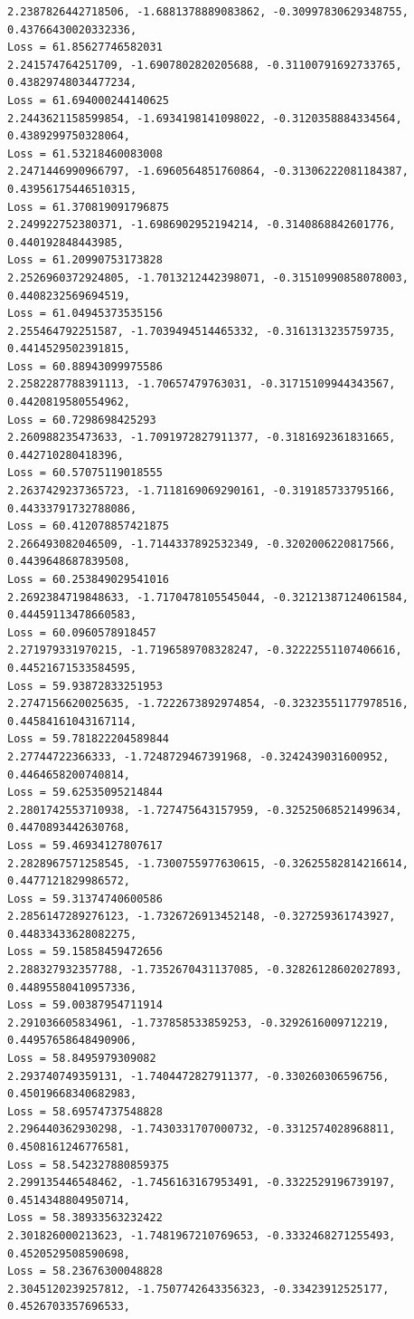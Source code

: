 \documentclass[11pt]{article}
\begin{document}
\begin{Verbatim}[commandchars=\\\{\}]
2.2387826442718506, -1.6881378889083862, -0.30997830629348755,
0.43766430020332336,
Loss = 61.85627746582031
2.241574764251709, -1.6907802820205688, -0.31100791692733765,
0.43829748034477234,
Loss = 61.694000244140625
2.2443621158599854, -1.6934198141098022, -0.3120358884334564,
0.4389299750328064,
Loss = 61.53218460083008
2.2471446990966797, -1.6960564851760864, -0.31306222081184387,
0.43956175446510315,
Loss = 61.370819091796875
2.249922752380371, -1.6986902952194214, -0.3140868842601776, 0.440192848443985,
Loss = 61.20990753173828
2.2526960372924805, -1.7013212442398071, -0.31510990858078003,
0.4408232569694519,
Loss = 61.04945373535156
2.255464792251587, -1.7039494514465332, -0.3161313235759735, 0.4414529502391815,
Loss = 60.88943099975586
2.2582287788391113, -1.70657479763031, -0.31715109944343567, 0.4420819580554962,
Loss = 60.7298698425293
2.260988235473633, -1.7091972827911377, -0.3181692361831665, 0.442710280418396,
Loss = 60.57075119018555
2.2637429237365723, -1.7118169069290161, -0.319185733795166,
0.44333791732788086,
Loss = 60.412078857421875
2.266493082046509, -1.7144337892532349, -0.3202006220817566, 0.4439648687839508,
Loss = 60.253849029541016
2.2692384719848633, -1.7170478105545044, -0.32121387124061584,
0.44459113478660583,
Loss = 60.0960578918457
2.271979331970215, -1.7196589708328247, -0.32222551107406616,
0.44521671533584595,
Loss = 59.93872833251953
2.2747156620025635, -1.7222673892974854, -0.32323551177978516,
0.44584161043167114,
Loss = 59.781822204589844
2.27744722366333, -1.7248729467391968, -0.3242439031600952, 0.4464658200740814,
Loss = 59.62535095214844
2.2801742553710938, -1.727475643157959, -0.32525068521499634,
0.4470893442630768,
Loss = 59.46934127807617
2.2828967571258545, -1.7300755977630615, -0.32625582814216614,
0.4477121829986572,
Loss = 59.31374740600586
2.2856147289276123, -1.7326726913452148, -0.327259361743927,
0.44833433628082275,
Loss = 59.15858459472656
2.288327932357788, -1.7352670431137085, -0.32826128602027893,
0.44895580410957336,
Loss = 59.00387954711914
2.291036605834961, -1.737858533859253, -0.3292616009712219, 0.44957658648490906,
Loss = 58.8495979309082
2.293740749359131, -1.7404472827911377, -0.330260306596756, 0.45019668340682983,
Loss = 58.69574737548828
2.296440362930298, -1.7430331707000732, -0.3312574028968811, 0.4508161246776581,
Loss = 58.542327880859375
2.299135446548462, -1.7456163167953491, -0.3322529196739197, 0.4514348804950714,
Loss = 58.38933563232422
2.301826000213623, -1.7481967210769653, -0.3332468271255493, 0.4520529508590698,
Loss = 58.23676300048828
2.3045120239257812, -1.7507742643356323, -0.33423912525177, 0.4526703357696533,

\end{Verbatim}
\end{document}
